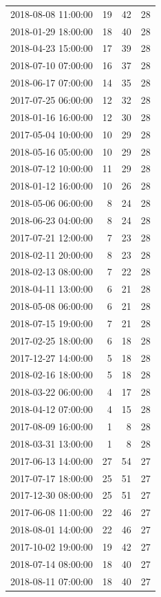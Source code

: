 \begin{tabular}{lrrr}
2018-08-08 11:00:00 & 19 & 42 & 28 \\
2018-01-29 18:00:00 & 18 & 40 & 28 \\
2018-04-23 15:00:00 & 17 & 39 & 28 \\
2018-07-10 07:00:00 & 16 & 37 & 28 \\
2018-06-17 07:00:00 & 14 & 35 & 28 \\
2017-07-25 06:00:00 & 12 & 32 & 28 \\
2018-01-16 16:00:00 & 12 & 30 & 28 \\
2017-05-04 10:00:00 & 10 & 29 & 28 \\
2018-05-16 05:00:00 & 10 & 29 & 28 \\
2018-07-12 10:00:00 & 11 & 29 & 28 \\
2018-01-12 16:00:00 & 10 & 26 & 28 \\
2018-05-06 06:00:00 & 8 & 24 & 28 \\
2018-06-23 04:00:00 & 8 & 24 & 28 \\
2017-07-21 12:00:00 & 7 & 23 & 28 \\
2018-02-11 20:00:00 & 8 & 23 & 28 \\
2018-02-13 08:00:00 & 7 & 22 & 28 \\
2018-04-11 13:00:00 & 6 & 21 & 28 \\
2018-05-08 06:00:00 & 6 & 21 & 28 \\
2018-07-15 19:00:00 & 7 & 21 & 28 \\
2017-02-25 18:00:00 & 6 & 18 & 28 \\
2017-12-27 14:00:00 & 5 & 18 & 28 \\
2018-02-16 18:00:00 & 5 & 18 & 28 \\
2018-03-22 06:00:00 & 4 & 17 & 28 \\
2018-04-12 07:00:00 & 4 & 15 & 28 \\
2017-08-09 16:00:00 & 1 & 8 & 28 \\
2018-03-31 13:00:00 & 1 & 8 & 28 \\
2017-06-13 14:00:00 & 27 & 54 & 27 \\
2017-07-17 18:00:00 & 25 & 51 & 27 \\
2017-12-30 08:00:00 & 25 & 51 & 27 \\
2017-06-08 11:00:00 & 22 & 46 & 27 \\
2018-08-01 14:00:00 & 22 & 46 & 27 \\
2017-10-02 19:00:00 & 19 & 42 & 27 \\
2018-07-14 08:00:00 & 18 & 40 & 27 \\
2018-08-11 07:00:00 & 18 & 40 & 27 \\

\end{tabular}
